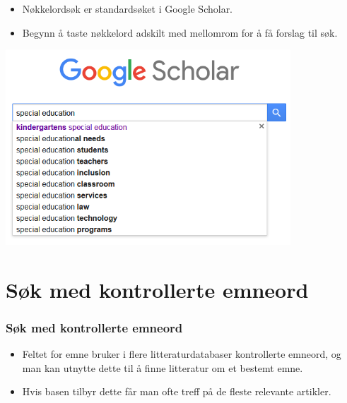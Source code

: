 \begin{frame}
  \begin{itemize}
  \item Nøkkelordsøk er standardsøket i Google Scholar.
  \item Begynn å taste nøkkelord adskilt med mellomrom for å få forslag til søk.
  \end{itemize}

  \centering
  \includegraphics[width=0.8\textwidth]{../media/google-scholar.png}
\end{frame}

\section{Søk med kontrollerte emneord}
\begin{frame}
  \frametitle{Søk med kontrollerte emneord}
  \begin{itemize}
  \item \alert{Feltet} for emne bruker i flere litteraturdatabaser \alert{kontrollerte emneord}, og man kan utnytte dette til å finne litteratur om et bestemt emne.
  \item Hvis basen tilbyr dette får man ofte treff på de fleste relevante artikler.
  \end{itemize}
\end{frame}
